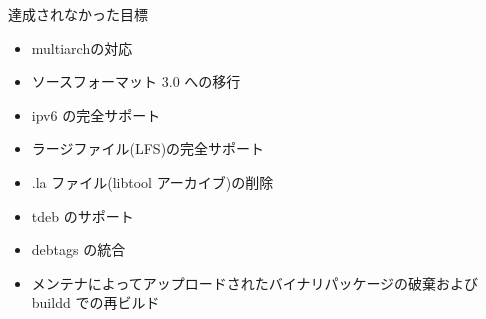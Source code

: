 \begin{frame}{達成されなかった目標}%

\begin{itemize}
\item multiarchの対応

\item ソースフォーマット 3.0 への移行 

\item ipv6 の完全サポート
\item ラージファイル(LFS)の完全サポート
\item .la ファイル(libtool アーカイブ)の削除
\item tdeb のサポート
\item debtags の統合  
\item メンテナによってアップロードされたバイナリパッケージの破棄および
      buildd での再ビルド
\end{itemize}
\end{frame}


